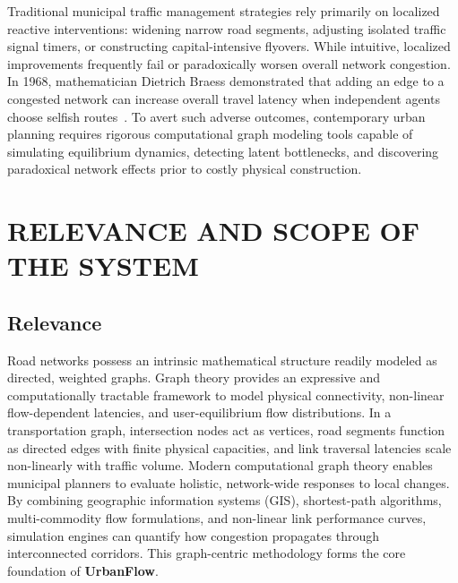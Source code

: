 \documentclass[12pt,a4paper]{report}
\begin{document}
Traditional municipal traffic management strategies rely primarily on localized reactive interventions: widening narrow road segments, adjusting isolated traffic signal timers, or constructing capital-intensive flyovers. While intuitive, localized improvements frequently fail or paradoxically worsen overall network congestion. In 1968, mathematician Dietrich Braess demonstrated that adding an edge to a congested network can increase overall travel latency when independent agents choose selfish routes~\cite{braess1968}. To avert such adverse outcomes, contemporary urban planning requires rigorous computational graph modeling tools capable of simulating equilibrium dynamics, detecting latent bottlenecks, and discovering paradoxical network effects prior to costly physical construction.

\section{RELEVANCE AND SCOPE OF THE SYSTEM}

\subsection*{Relevance}
Road networks possess an intrinsic mathematical structure readily modeled as directed, weighted graphs. Graph theory provides an expressive and computationally tractable framework to model physical connectivity, non-linear flow-dependent latencies, and user-equilibrium flow distributions. In a transportation graph, intersection nodes act as vertices, road segments function as directed edges with finite physical capacities, and link traversal latencies scale non-linearly with traffic volume. Modern computational graph theory enables municipal planners to evaluate holistic, network-wide responses to local changes. By combining geographic information systems (GIS), shortest-path algorithms, multi-commodity flow formulations, and non-linear link performance curves, simulation engines can quantify how congestion propagates through interconnected corridors. This graph-centric methodology forms the core foundation of \textbf{UrbanFlow}.
\end{document}
